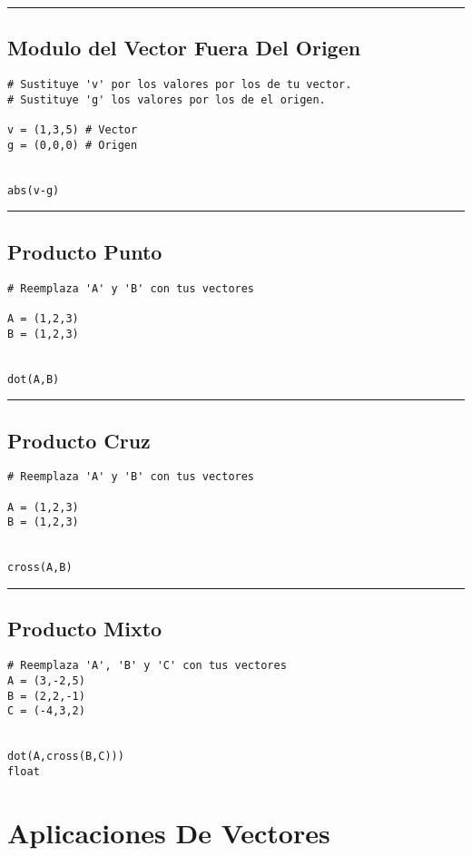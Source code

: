 \documentclass{article}
\begin{document}
\noindent\rule{\textwidth}{0.5pt}

\subsection{Modulo del Vector Fuera Del Origen}
\label{sec:org772d0c6}
\begin{verbatim}
# Sustituye 'v' por los valores por los de tu vector.
# Sustituye 'g' los valores por los de el origen.

v = (1,3,5) # Vector
g = (0,0,0) # Origen


abs(v-g)
\end{verbatim}

\noindent\rule{\textwidth}{0.5pt}

\subsection{Producto Punto}
\label{sec:org5d5a916}
\begin{verbatim}
# Reemplaza 'A' y 'B' con tus vectores

A = (1,2,3)
B = (1,2,3)


dot(A,B)
\end{verbatim}

\noindent\rule{\textwidth}{0.5pt}

\subsection{Producto Cruz}
\label{sec:org0840ccb}
\begin{verbatim}
# Reemplaza 'A' y 'B' con tus vectores

A = (1,2,3)
B = (1,2,3)


cross(A,B)
\end{verbatim}

\noindent\rule{\textwidth}{0.5pt}

\subsection{Producto Mixto}
\label{sec:orgdbec2c2}
\begin{verbatim}
# Reemplaza 'A', 'B' y 'C' con tus vectores
A = (3,-2,5)
B = (2,2,-1)
C = (-4,3,2)


dot(A,cross(B,C)))
float
\end{verbatim}

\section{Aplicaciones De Vectores}
\label{sec:orgfbe662d}
\end{document}
